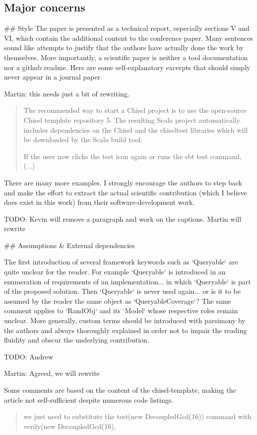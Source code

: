 \documentclass{article}
\newcommand{\todo}[1]{{\color{olive} TODO: #1}}
\newcommand{\martin}[1]{{\color{blue} Martin: #1\\}}
\begin{document}
\subsection*{Major concerns}
\#\# Style
The paper is presented as a technical report, especially sections V and VI, which contain the additional content to the conference paper.
Many sentences sound like attempts to justify that the authors have actually done the work by themselves. 
More importantly, a scientific paper is neither a tool documentation nor a github readme.
Here are some self-explanatory excerpts that should simply never appear in a journal paper.

\martin{this needs just a bit of rewriting.}

\begin{quote}
The recommended way to
start a Chisel project is to use the open-source Chisel template
repository 5. The resulting Scala project automatically includes
dependencies on the Chisel and the chiseltest libraries which
will be downloaded by the Scala build tool.

If the user now clicks the test icon again
or runs the sbt test command, (...)
\end{quote}


There are many more examples. 
I strongly encourage the authors to step back and make the effort to extract the actual scientific contribution (which I believe does exist in this work) from their software-development work.

\todo{Kevin will remove a paragraph and work on the captions. Martin will rewrite}


\#\# Assumptions \& External dependencies

The first introduction of several framework keywords such as `Queryable` are quite unclear for the reader.
For example `Queryable` is introduced in an enumeration of requirements of an implementation... in which `Queryable` is part of the proposed solution.
Then `Queryable` is never used again... or is it to be assumed by the reader the same object as `QueryableCoverage`?
The same comment applies to `RandObj` and its `Model` whose respective roles remain unclear.
More generally, custom terms should be introduced with parsimony by the authors and always thoroughly explained in order not to impair the reading fluidity and obscur the underlying contribution.

\todo{Andrew}

\martin{Agreed, we will rewrite}

Some comments are based on the content of the chisel-template, making the article not self-sufficient despite numerous code listings.
\begin{quote}
we just need to substitute the test(new DecoupledGcd(16)) command with verify(new DecoupledGcd(16),
\end{quote}
\end{document}
